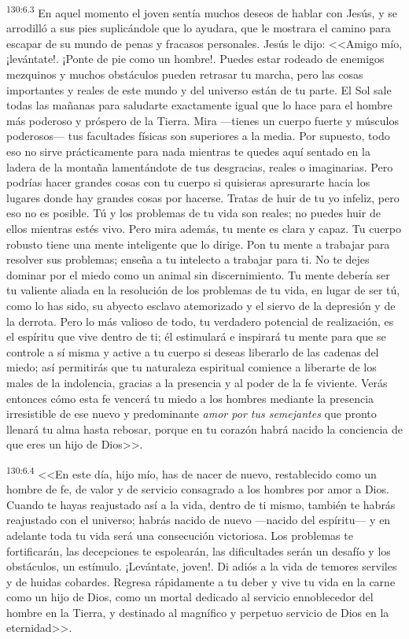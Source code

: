 \par 
\textsuperscript{130:6.3} En aquel momento el joven sentía muchos deseos de hablar con Jesús, y se arrodilló a sus pies suplicándole que lo ayudara, que le mostrara el camino para escapar de su mundo de penas y fracasos personales. Jesús le dijo: <<Amigo mío, ¡levántate!. ¡Ponte de pie como un hombre!. Puedes estar rodeado de enemigos mezquinos y muchos obstáculos pueden retrasar tu marcha, pero las cosas importantes y reales de este mundo y del universo están de tu parte. El Sol sale todas las mañanas para saludarte exactamente igual que lo hace para el hombre más poderoso y próspero de la Tierra. Mira ---tienes un cuerpo fuerte y músculos poderosos--- tus facultades físicas son superiores a la media. Por supuesto, todo eso no sirve prácticamente para nada mientras te quedes aquí sentado en la ladera de la montaña lamentándote de tus desgracias, reales o imaginarias. Pero podrías hacer grandes cosas con tu cuerpo si quisieras apresurarte hacia los lugares donde hay grandes cosas por hacerse. Tratas de huir de tu yo infeliz, pero eso no es posible. Tú y los problemas de tu vida son reales; no puedes huir de ellos mientras estés vivo. Pero mira además, tu mente es clara y capaz. Tu cuerpo robusto tiene una mente inteligente que lo dirige. Pon tu mente a trabajar para resolver sus problemas; enseña a tu intelecto a trabajar para ti. No te dejes dominar por el miedo como un animal sin discernimiento. Tu mente debería ser tu valiente aliada en la resolución de los problemas de tu vida, en lugar de ser tú, como lo has sido, su abyecto esclavo atemorizado y el siervo de la depresión y de la derrota. Pero lo más valioso de todo, tu verdadero potencial de realización, es el espíritu que vive dentro de ti; él estimulará e inspirará tu mente para que se controle a sí misma y active a tu cuerpo si deseas liberarlo de las cadenas del miedo; así permitirás que tu naturaleza espiritual comience a liberarte de los males de la indolencia, gracias a la presencia y al poder de la fe viviente. Verás entonces cómo esta fe vencerá tu miedo a los hombres mediante la presencia irresistible de ese nuevo y predominante \textit{amor por tus semejantes} que pronto llenará tu alma hasta rebosar, porque en tu corazón habrá nacido la conciencia de que eres un hijo de Dios>>.

\par 
\textsuperscript{130:6.4} <<En este día, hijo mío, has de nacer de nuevo, restablecido como un hombre de fe, de valor y de servicio consagrado a los hombres por amor a Dios. Cuando te hayas reajustado así a la vida, dentro de ti mismo, también te habrás reajustado con el universo; habrás nacido de nuevo ---nacido del espíritu--- y en adelante toda tu vida será una consecución victoriosa. Los problemas te fortificarán, las decepciones te espolearán, las dificultades serán un desafío y los obstáculos, un estímulo. ¡Levántate, joven!. Di adiós a la vida de temores serviles y de huidas cobardes. Regresa rápidamente a tu deber y vive tu vida en la carne como un hijo de Dios, como un mortal dedicado al servicio ennoblecedor del hombre en la Tierra, y destinado al magnífico y perpetuo servicio de Dios en la eternidad>>.


